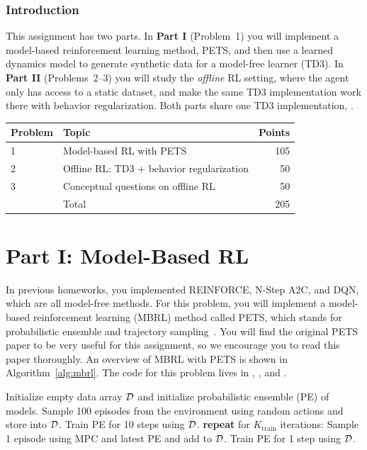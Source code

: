 \documentclass[11pt]{article}
\begin{document}
\newpage
\section*{Introduction}
This assignment has two parts. In \textbf{Part I} (Problem~1) you will implement a model-based reinforcement learning method, PETS, and then use a learned dynamics model to generate synthetic data for a model-free learner (TD3). In \textbf{Part II} (Problems~2--3) you will study the \emph{offline} RL setting, where the agent only has access to a static dataset, and make the same TD3 implementation work there with behavior regularization. Both parts share one TD3 implementation, .

\begin{center}
\begin{tabular}{llr}
\toprule
Problem & Topic & Points \\
\midrule
1 & Model-based RL with PETS & 105 \\
2 & Offline RL: TD3 + behavior regularization & 50 \\
3 & Conceptual questions on offline RL & 50 \\
\midrule
 & Total & 205 \\
\bottomrule
\end{tabular}
\end{center}

\part*{Part I: Model-Based RL}

In previous homeworks, you implemented REINFORCE, N-Step A2C, and DQN, which are all model-free methods. For this problem, you will implement a model-based reinforcement learning (MBRL) method called PETS, which stands for probabilistic ensemble and trajectory sampling~\cite{chua2018pets}. You will find the original PETS paper to be very useful for this assignment, so we encourage you to read this paper thoroughly. An overview of MBRL with PETS is shown in Algorithm~\ref{alg:mbrl}. The code for this problem lives in , , and .

\begin{algorithm}[H]
\caption{MBRL with PETS}\label{alg:mbrl}
\begin{algorithmic}[1]
  \State Initialize empty data array $\mathcal{D}$ and initialize probabilistic ensemble (PE) of models.
  \State Sample 100 episodes from the environment using random actions and store into $\mathcal{D}$.
  \State Train PE for 10 steps using $\mathcal{D}$.
  \State \textbf{repeat} for $K_\text{train}$ iterations:
  \State \hspace{\algorithmicindent} Sample 1 episode using MPC and latest PE and add to $\mathcal{D}$.
  \State \hspace{\algorithmicindent} Train PE for 1 step using $\mathcal{D}$.
\EndProcedure
\end{algorithmic}
\end{algorithm}
\end{document}
